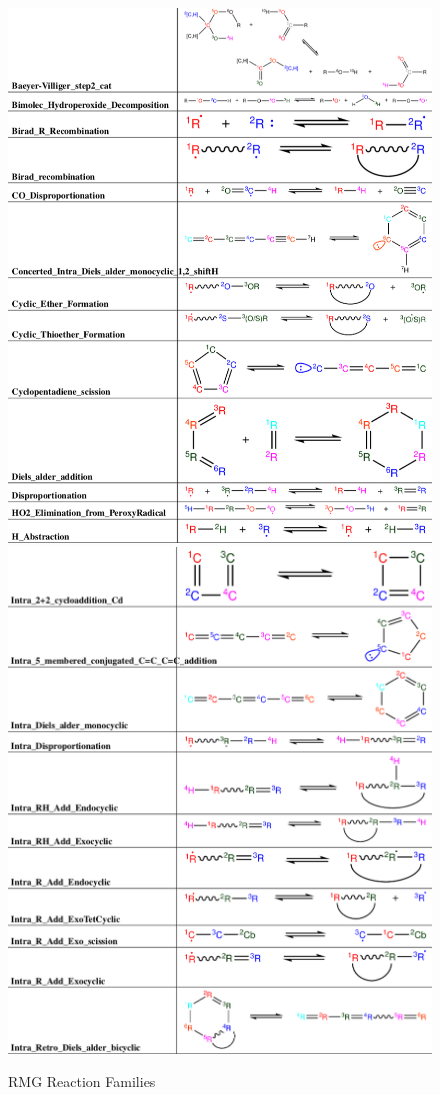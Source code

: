  \begin{figure}
     \centering
     \includegraphics[scale=0.5, keepaspectratio]{images/rxn_fam3.png}
     \includegraphics[scale=0.5, keepaspectratio]{images/rxn_fam4.png}
     \caption{RMG Reaction Families \cite{Gao2016ReactionMechanisms}}
     \label{fig:rxn_fam2}
 \end{figure}
 
